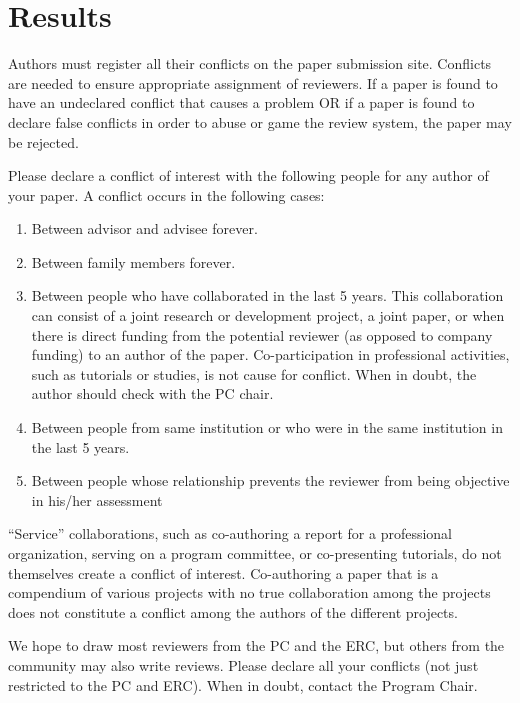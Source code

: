 \section{Results}

Authors must register all their conflicts on the paper submission site. Conflicts are needed to ensure appropriate assignment of reviewers. If a paper is found to have an undeclared conflict that causes a problem OR if a paper is found to declare false conflicts in order to abuse or game the review system, the paper may be rejected.

Please declare a conflict of interest with the following people for any author of your paper.
A conflict occurs in the following cases:
\begin{enumerate}
\item Between advisor and advisee forever. 
\item Between family members forever. 
\item Between people who have collaborated in the last 5 years. This collaboration can consist of a joint research or development project, a joint paper, or when there is direct funding from the potential reviewer (as opposed to company funding) to an author of the paper. Co-participation in professional activities, such as tutorials or studies, is not cause for conflict. When in doubt, the author should check with the PC chair. 
\item Between people from same institution or who were in the same institution in the last 5 years. 
\item Between people whose relationship prevents the reviewer from being objective in his/her assessment
\end{enumerate}


``Service'' collaborations, such as co-authoring a report for a professional organization, serving on a program committee, or co-presenting tutorials, do not themselves create a conflict of interest. Co-authoring a paper that is a compendium of various projects with no true collaboration among the projects does not constitute a conflict among the authors of the different projects.

We hope to draw most reviewers from the PC and the ERC, but others from the community may also write reviews. Please declare all your conflicts (not just restricted to the PC and ERC). When in doubt, contact the Program Chair.
